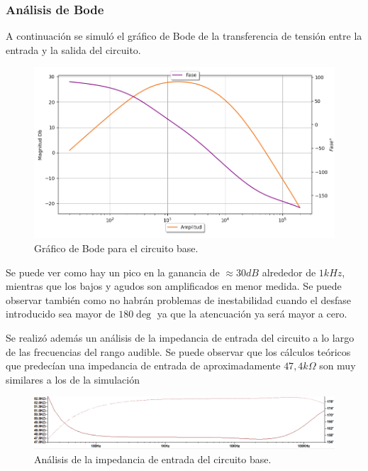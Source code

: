 \subsubsection{Análisis de Bode}
A continuación se simuló el gráfico de Bode de la transferencia de tensión entre la entrada y la salida del circuito.
\begin{figure}[H]
	\centering
	\includegraphics[width=1\textwidth, trim={0 0 0 0}, clip]{Ejercicio5/Imagenes/Circuito_base/Sim/circuito_base_bode.png}
	\caption{Gráfico de Bode para el circuito base.}
	\label{fig:sim_base}
\end{figure}

Se puede ver como hay un pico en la ganancia de $\approx 30dB$ alrededor de $1kHz$, mientras que los bajos y agudos son amplificados en menor medida. Se puede observar también como no habrán problemas de inestabilidad cuando el desfase introducido sea mayor de $180\deg$ ya que la atencuación ya será mayor a cero.

Se realizó además un análisis de la impedancia de entrada del circuito a lo largo de las frecuencias del rango audible. Se puede observar que los cálculos teóricos que predecían una impedancia de entrada de aproximadamente $47,4k\Omega$ son muy similares a los de la simulación

\begin{center}
\begin{figure}[H]
	\hspace{-5em}
	\includegraphics[width=1.3\textwidth, trim={0 0 0 0}, clip, scale=2]{Ejercicio5/Imagenes/Circuito_base/Sim/circuito_base_zin.png}
	\caption{Análisis de la impedancia de entrada del circuito base.}
	\label{fig:sim_base}
\end{figure}
\end{center}

